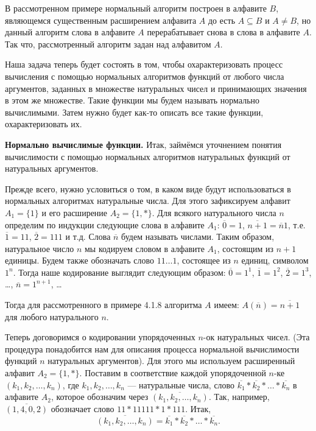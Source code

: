 \documentclass[a4paper,12pt]{article}
\begin{document}
В рассмотренном примере нормальный алгоритм построен в алфавите \(B\), являющемся существенным расширением алфавита \(A\) до есть \(A \subseteq B\) и \(A \neq B\), но данный алгоритм слова в алфавите \(A\) перерабатывает снова в слова в алфавите \(A\). Так что, рассмотренный алгоритм задан над алфавитом \(A\).

Наша задача теперь будет состоять в том, чтобы охарактеризовать процесс вычисления с помощью нормальных алгоритмов функций от любого числа аргументов, заданных в множестве натуральных чисел и принимающих значения в этом же множестве. Такие функции мы будем называть нормально вычислимыми. Затем нужно будет как-то описать все такие функции, охарактеризовать их.

\textbf{Нормально вычислимые функции.} Итак, займёмся уточнением понятия вычислимости с помощью нормальных алгоритмов натуральных функций от натуральных аргументов.

Прежде всего, нужно условиться о том, в каком виде будут использоваться в нормальных алгоритмах натуральные числа. Для этого зафиксируем алфавит \(A_1 = \{1\}\) и его расширение \(A_2 = \{1, *\}\). Для всякого натурального числа \(n\) определим по индукции следующие слова в алфавите \(A_1\): \(\overline{0} = 1\), \(\overline{n+1} = \overline{n}1\), т.е. \(\overline{1} = 11\), \(\overline{2} = 111\) и т.д. Слова \(\overline{n}\) будем называть числами. Таким образом, натуральное число \(n\) мы кодируем словом в алфавите \(A_1\), состоящим из \(n + 1\) единицы. Будем также обозначать слово \(11\dots1\), состоящее из \(n\) единиц, символом \(1^n\). Тогда наше кодирование выглядит следующим образом: \(\overline{0} = 1^1\), \(\overline{1} = 1^2\), \(\overline{2} = 1^3\), \dots, \(\overline{n} = 1^{n+1}\), \dots

Тогда для рассмотренного в примере 4.1.8 алгоритма \(A\) имеем: \(A(\overline{n}) = \overline{n+1}\) для любого натурального \(n\).

Теперь договоримся о кодировании упорядоченных \(n\)-ок натуральных чисел. (Эта процедура понадобится нам для описания процесса нормальной вычислимости функций \(n\) натуральных аргументов). Для этого мы используем расширенный алфавит \(A_2 = \{1, *\}\). Поставим в соответствие каждой упорядоченной \(n\)-ке \((k_1, k_2, \dots, k_n)\), где \(k_1, k_2, \dots, k_n\) --- натуральные числа, слово \(\overline{k_1} * \overline{k_2} * \dots * \overline{k_n}\) в алфавите \(A_2\), которое обозначим через \(\overline{(k_1, k_2, \dots, k_n)}\). Так, например, \(\overline{(1, 4, 0, 2)}\) обозначает слово \(11 * 11111 * 1 * 111\). Итак,
\[
\overline{(k_1, k_2, \dots, k_n)} = \overline{k_1} * \overline{k_2} * \dots * \overline{k_n}.
\]
\end{document}
